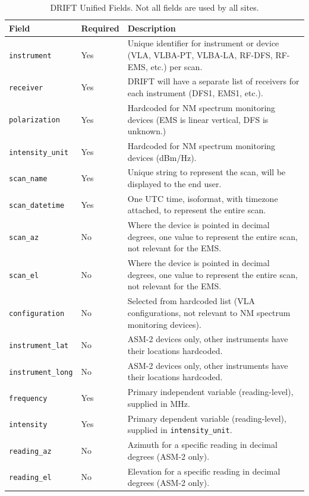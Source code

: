 \documentclass[titlepage]{article}
\begin{document}
\begin{table}[ht]
  \begin{center}
    \begin{tabularx}{\linewidth}{l|l|X}
      Field       & Required  & Description \\ \hline
      \lstinline|instrument|    & Yes & Unique identifier for instrument or device (VLA, VLBA-PT, VLBA-LA, RF-DFS, RF-EMS, etc.) per scan.\\
      \lstinline|receiver|      & Yes & DRIFT will have a separate list of receivers for each instrument (DFS1, EMS1, etc.). \\
      \lstinline|polarization|  & Yes & Hardcoded for NM spectrum monitoring devices (EMS is linear vertical, DFS is unknown.)\\
      \lstinline|intensity_unit|& Yes & Hardcoded for NM spectrum monitoring devices (dBm/Hz). \\
      \lstinline|scan_name|     & Yes & Unique string to represent the scan, will be displayed to the end user.\\
      \lstinline|scan_datetime| & Yes & One UTC time, isoformat, with timezone attached, to represent the entire scan.\\
      \lstinline|scan_az|       & No  & Where the device is pointed in decimal degrees, one value to represent the entire scan, not relevant for the EMS.\\
      \lstinline|scan_el|       & No  & Where the device is pointed in decimal degrees, one value to represent the entire scan, not relevant for the EMS.\\
      \lstinline|configuration| & No  & Selected from hardcoded list (VLA configurations, not relevant to NM spectrum monitoring devices).\\
      \lstinline|instrument_lat|& No  & ASM-2 devices only, other instruments have their locations hardcoded.\\
      \lstinline|instrument_long|&No  & ASM-2 devices only, other instruments have their locations hardcoded.\\
      \lstinline|frequency|     & Yes & Primary independent variable (reading-level), supplied in MHz.\\
      \lstinline|intensity|     & Yes & Primary dependent variable (reading-level), supplied in \lstinline|intensity_unit|.\\
      \lstinline|reading_az|    & No  & Azimuth for a specific reading in decimal degrees (ASM-2 only).\\
      \lstinline|reading_el|    & No  & Elevation for a specific reading in decimal degrees (ASM-2 only).\\
    \end{tabularx}
  \end{center}
  \caption{DRIFT Unified Fields. Not all fields are used by all sites.}\label{tab:driftdata}
\end{table}
\end{document}
